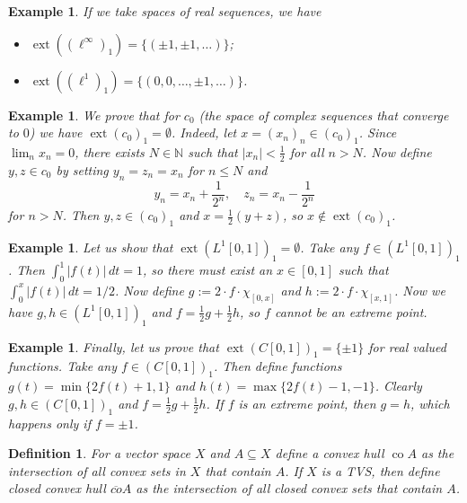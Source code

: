 \documentclass[10pt, a4paper]{article}
\newtheorem{defi}[thm]{Definition}
\newenvironment{noticeB}{%
  \tcolorbox[%
  notitle,
  empty,
  enhanced,  %
  breakable,
  coltext=black,
  colback=white, 
  fontupper=\rmfamily,
  noparskip,
  sharp corners,
  boxrule=-1pt,  %
  frame hidden,
  left=7pt,  %
  right=7pt,
  top=5pt,
  bottom=5pt,
  before skip=2.5ex plus 2pt,
  after skip=2.5ex plus 2pt,
  borderline west = {1.5pt}{-0.1pt}{blue!30!black}, %
  overlay unbroken and last={%
    \draw[color=black, line width=1.25pt]
    ($(frame.south west)+(1.pt, -0.1pt)$) -- ++(2em, 0);
  }
  ]}
{\endtcolorbox}
\newenvironment{definition}{\begin{noticeB}\begin{defi}}{%
    \end{defi}\end{noticeB}}
\newtheorem{example}[thm]{Example}
\newcommand{\N}{\mathbb {N}}
\DeclareMathOperator{\ext}{ext}
\DeclareMathOperator{\co}{co}
\begin{document}
\begin{example}
  If we take spaces of real sequences, we have
  \begin{itemize}
    \item $\ext ((\ell^\infty)_1) = \{(\pm 1, \pm 1, \dots)\}$;
    \item $\ext ((\ell^1)_1) = \{(0, 0, \dots, \pm 1, \dots)\}$.
  \end{itemize} 
\end{example}

\begin{example}
  We prove that for $c_0$ (the space of complex sequences that converge to $0$) we have $\ext (c_0)_1 = \emptyset$. 
  Indeed, let $x = (x_n)_n \in (c_0)_1$.
  Since $\lim_n x_n = 0$, there exists $N \in \N$ such that $|x_n| < \frac{1}{2}$ for all $n > N$.
  Now define $y, z \in c_0$ by setting $y_n = z_n = x_n$ for $n \leq N$
  and $$y_n = x_n + \frac{1}{2^n},\quad z_n = x_n - \frac{1}{2^n}$$ 
  for $n > N$. Then $y, z \in (c_0)_1$ and $x = \frac{1}{2} (y + z)$, so $x \notin \ext (c_0)_1$.
\end{example}

\begin{example}
  Let us show that $\ext (L^1 [0, 1])_1 = \emptyset$. Take any $f \in (L^1 [0, 1])_1$.
  Then $\int _0 ^1 |f(t)| \, dt = 1$, so there must exist an $x \in [0, 1]$ such that 
  $\int _0 ^x |f(t)| \, dt = 1/2$. Now define 
  $g := 2 \cdot f \cdot \chi_{[0, x]}$ and $h := 2 \cdot f \cdot \chi_{[x, 1]}$. 
  Now we have $g, h \in (L^1 [0, 1])_1$ and $f = \frac{1}{2}g + \frac{1}{2} h$, so $f$ cannot be an extreme point.
\end{example}

\begin{example}
  Finally, let us prove that $\ext (C[0, 1])_1 = \{\pm 1\}$ for real valued functions.
  Take any $f \in (C[0, 1])_1$. Then define functions $g(t) = \min \{2f(t) + 1, 1\}$ and $h(t) = \max \{2 f(t) - 1, -1\}$.
  Clearly $g, h \in (C[0, 1])_1$ and $f = \frac{1}{2} g + \frac{1}{2} h$. If $f$ is an extreme point, then $g = h$, which happens only if $f = \pm 1$.
\end{example}

\begin{definition}
  For a vector space $X$ and $A \subseteq X$ define a convex hull $\co A$ as the intersection of all convex sets in $X$ that contain $A$.
  If $X$ is a TVS, then define closed convex hull $\overline{co} A$ as the intersection of all closed convex sets that contain $A$.
\end{definition}
\end{document}
